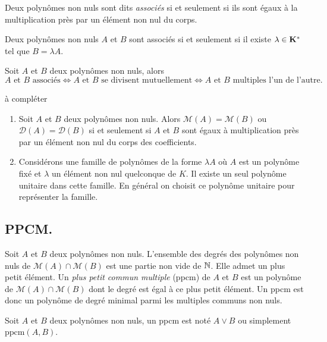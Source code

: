 \begin{defi}
 Deux polynômes non nuls sont dits \emph{associés} si et seulement si ils sont égaux à la multiplication près par un élément non nul du corps.
\end{defi}
Deux polynômes non nuls $A$ et $B$ sont associés si et seulement si il existe $\lambda \in \mathbf{K}^*$ tel que $B=\lambda A$.
\begin{prop}
 Soit $A$ et $B$ deux polynômes non nuls, alors
\[
 A \text{ et } B \text{ associés} \Leftrightarrow A \text{ et } B \text{ se divisent mutuellement}
\Leftrightarrow A \text{ et } B \text{ multiples l'un de l'autre.}
\]
\end{prop}
\begin{demo}
 à compléter
\end{demo}

\begin{rem}
  \begin{enumerate}
       \item  Soit $A$ et $B$ deux polynômes non nuls. Alors $\mathcal M (A)=\mathcal M (B)$ ou  $\mathcal D (A)=\mathcal D (B)$ si et seulement si $A$ et $B$ sont égaux à multiplication près par un élément non nul du corps des coefficients.
       \item Considérons une famille de polynômes de la forme $\lambda A$ où $A$ est un polynôme fixé et $\lambda$ un élément non nul quelconque de $K$. Il existe un seul polynôme unitaire dans cette famille. En général on choisit ce polynôme unitaire pour représenter la famille.
   \end{enumerate}
\end{rem}


\subsection{PPCM.}
\begin{defi}
 Soit $A$ et $B$ deux polynômes non nuls.  L'ensemble des degrés des polynômes non nuls de $\mathcal{M}(A)\cap \mathcal{M}(B)$ est une partie non vide de $\mathbb{N}$. Elle admet un plus petit élément. Un \emph{plus petit commun multiple} (ppcm) de $A$ et $B$ est un polynôme de $\mathcal{M}(A)\cap \mathcal{M}(B)$ dont le degré est égal à ce plus petit élément. Un ppcm est donc un polynôme de degré minimal parmi les multiples communs non nuls.
\end{defi}

\begin{nota}
 Soit $A$ et $B$ deux polynômes non nuls, un ppcm est noté $A\vee B$ ou simplement $\text{ppcm}(A,B)$.
\end{nota}

